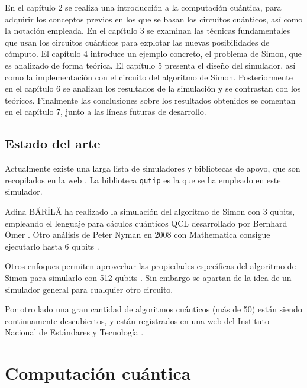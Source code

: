 En el capítulo 2 se realiza una introducción a la computación cuántica, para 
adquirir los conceptos previos en los que se basan los circuitos cuánticos, así 
como la notación empleada. En el capítulo 3 se examinan las técnicas 
fundamentales que usan los circuitos cuánticos para explotar las nuevas 
posibilidades de cómputo. El capítulo 4 introduce un ejemplo concreto, el 
problema de Simon, que es analizado de forma teórica. El capítulo 5 presenta el 
diseño del simulador, así como la implementación con el circuito del algoritmo 
de Simon.  Posteriormente en el capítulo 6 se analizan los resultados de la 
simulación y se contrastan con los teóricos. Finalmente las conclusiones sobre 
los resultados obtenidos se comentan en el capítulo 7, junto a las líneas 
futuras de desarrollo.

\section{Estado del arte}
Actualmente existe una larga lista de simuladores y bibliotecas de apoyo, que 
son recopilados en la web \cite{quantiki}. La biblioteca \texttt{qutip} es la 
que se ha empleado en este simulador.

 
Adina BĂRÎLĂ \cite{adina} ha realizado la simulación del algoritmo de Simon con 
3 qubits, empleando el lenguaje para cáculos cuánticos QCL desarrollado por 
Bernhard Ömer \cite{qcl}. Otro análisis de Peter Nyman en 2008 con Mathematica 
consigue ejecutarlo hasta 6 qubits \cite{mathematica}.

Otros enfoques permiten aprovechar las propiedades específicas del algoritmo de 
Simon para simularlo con 512 qubits \cite{niklas}.  Sin embargo se apartan de la 
idea de un simulador general para cualquier otro circuito.

Por otro lado una gran cantidad de algoritmos cuánticos (más de 50) están siendo 
continuamente descubiertos, y están registrados en una web del Instituto 
Nacional de Estándares y Tecnología \cite{zoo}.

\chapter{Computación cuántica}

